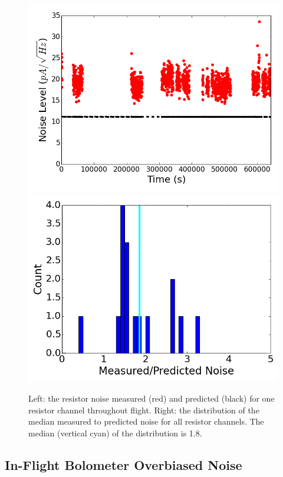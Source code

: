 
\begin{figure}[htp]
\begin{center}
\includegraphics[width=0.48\columnwidth]{figures/board59_wire3_ch13_noise_vs_time}
\includegraphics[width=0.48\columnwidth]{figures/resistor_noise_histogram.png}
\caption[Resistor noise versus time and histogram of all resistors' median noise]{Left: the resistor noise measured (red) and predicted (black) for one resistor channel throughout flight. Right: the distribution of the median measured to predicted noise for all resistor channels. The median (vertical cyan) of the distribution is 1.8. 
\label{fig:resistor_in_flight_noise} }
\end{center}
\end{figure}





\subsection{In-Flight Bolometer Overbiased Noise}
\label{sec:flight_overbias_noise}

